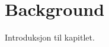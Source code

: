 \documentclass[../../main.tex]{subfiles}
\begin{document}

\chapter{Background}

Introduksjon til kapitlet.

\end{document}

